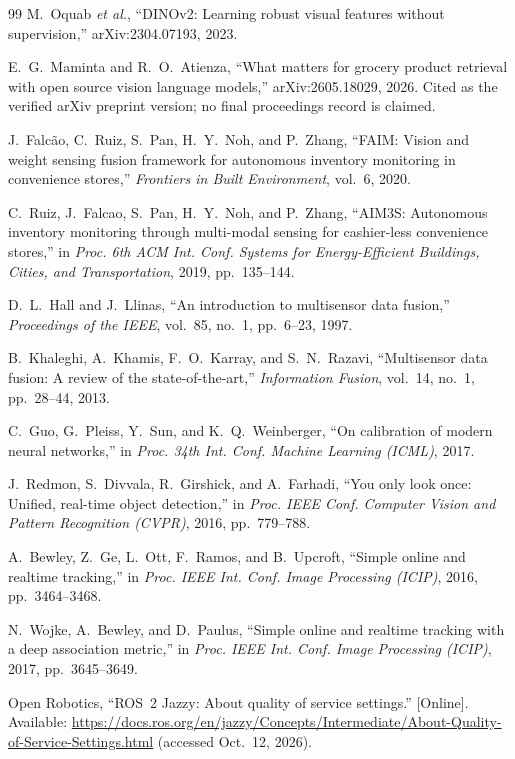 \documentclass[conference]{IEEEtran}
\begin{document}
\begin{thebibliography}{99}
 M.~Oquab \emph{et al.}, ``DINOv2: Learning robust visual features without supervision,''
arXiv:2304.07193, 2023.

 E.~G.~Maminta and R.~O.~Atienza, ``What matters for grocery product retrieval with open
source vision language models,'' arXiv:2605.18029, 2026. Cited as the verified arXiv preprint version;
no final proceedings record is claimed.

 J.~Falc\~{a}o, C.~Ruiz, S.~Pan, H.~Y.~Noh, and P.~Zhang, ``FAIM: Vision and weight
sensing fusion framework for autonomous inventory monitoring in convenience stores,'' \emph{Frontiers
in Built Environment}, vol.~6, 2020.

 C.~Ruiz, J.~Falcao, S.~Pan, H.~Y.~Noh, and P.~Zhang, ``AIM3S: Autonomous inventory
monitoring through multi-modal sensing for cashier-less convenience stores,'' in \emph{Proc. 6th ACM
Int. Conf. Systems for Energy-Efficient Buildings, Cities, and Transportation}, 2019, pp.~135--144.

 D.~L.~Hall and J.~Llinas, ``An introduction to multisensor data fusion,''
\emph{Proceedings of the IEEE}, vol.~85, no.~1, pp.~6--23, 1997.

 B.~Khaleghi, A.~Khamis, F.~O.~Karray, and S.~N.~Razavi, ``Multisensor data fusion: A
review of the state-of-the-art,'' \emph{Information Fusion}, vol.~14, no.~1, pp.~28--44, 2013.

 C.~Guo, G.~Pleiss, Y.~Sun, and K.~Q.~Weinberger, ``On calibration of modern neural
networks,'' in \emph{Proc. 34th Int. Conf. Machine Learning (ICML)}, 2017.

 J.~Redmon, S.~Divvala, R.~Girshick, and A.~Farhadi, ``You only look once: Unified,
real-time object detection,'' in \emph{Proc. IEEE Conf. Computer Vision and Pattern Recognition
(CVPR)}, 2016, pp.~779--788.

 A.~Bewley, Z.~Ge, L.~Ott, F.~Ramos, and B.~Upcroft, ``Simple online and realtime
tracking,'' in \emph{Proc. IEEE Int. Conf. Image Processing (ICIP)}, 2016, pp.~3464--3468.

 N.~Wojke, A.~Bewley, and D.~Paulus, ``Simple online and realtime tracking with a deep
association metric,'' in \emph{Proc. IEEE Int. Conf. Image Processing (ICIP)}, 2017, pp.~3645--3649.

 Open Robotics, ``ROS~2 Jazzy: About quality of service settings.'' [Online]. Available:
\url{https://docs.ros.org/en/jazzy/Concepts/Intermediate/About-Quality-of-Service-Settings.html}
(accessed Oct.~12, 2026).


\end{thebibliography}
\end{document}
